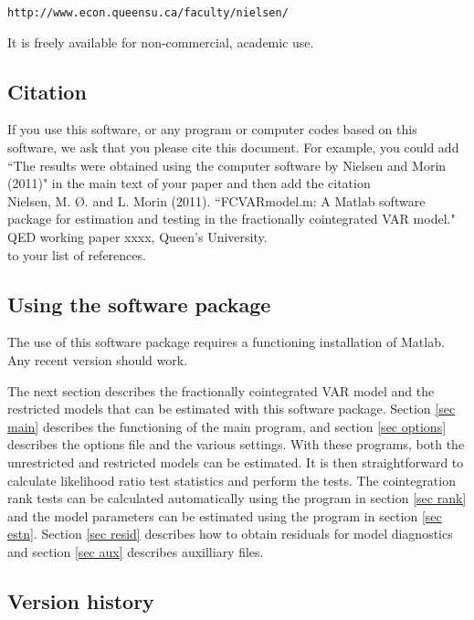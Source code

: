 \documentclass[12pt]{article}
\begin{document}
\begin{center} \texttt{http://www.econ.queensu.ca/faculty/nielsen/}
\end{center}

\noindent It is freely available for non-commercial, academic use.

\subsection{Citation}

If you use this software, or any program or computer codes based on this software, we ask that you please cite this document. For example, you could add ``The results were obtained using the computer software by Nielsen and Morin (2011)" in the main text of your paper and then add the citation\\

\noindent Nielsen, M. \O. and L. Morin (2011). ``FCVARmodel.m: A Matlab software package for estimation and testing in the fractionally cointegrated VAR model." QED working paper xxxx, Queen's University.
\\

\noindent to your list of references.

\subsection{Using the software package}

The use of this software package requires a functioning installation of Matlab. Any recent version should work.

The next section describes the fractionally cointegrated VAR model and the restricted models that can be estimated with this software package. Section \ref{sec main} describes the functioning of the main program, and section \ref{sec options} describes the options file and the various settings. With these programs, both the unrestricted and restricted models can be estimated. It is then straightforward to calculate likelihood ratio test statistics and perform the tests. The cointegration rank tests can be calculated automatically using the program in section \ref{sec rank} and the model parameters can be estimated using the program in section \ref{sec estn}. Section \ref{sec resid} describes how to obtain residuals for model diagnostics and section \ref{sec aux} describes auxilliary files.

\subsection{Version history}
\end{document}
